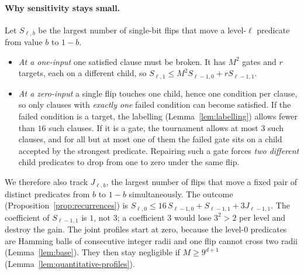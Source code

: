 \documentclass[11pt]{article}
\theoremstyle{definition}
\theoremstyle{remark}
\begin{document}
\paragraph{Why sensitivity stays small.}
Let \(S_{\ell,b}\) be the largest number of single-bit flips that move a
level-\(\ell\) predicate from value \(b\) to \(1-b\).
\begin{itemize}[leftmargin=2em]
\item \emph{At a one-input} one satisfied clause must be broken. It has \(M^2\) gates
and \(r\) targets, each on a different child, so
\(S_{\ell,1}\le M^2S_{\ell-1,0}+rS_{\ell-1,1}\).
\item \emph{At a zero-input} a single flip touches one child, hence one
condition per clause, so only clauses with \emph{exactly one} failed condition
can become satisfied. If the failed condition is a target, the labelling
(Lemma~\ref{lem:labelling}) allows fewer than \(16\) such clauses. If it is a gate,
the tournament allows at most \(3\) such clauses, and for all but at most one
of them the failed gate sits on a child accepted by the strongest predicate.
Repairing such a gate forces \emph{two different} child predicates to drop from one to
zero under the same flip.
\end{itemize}
We therefore also track \(J_{\ell,b}\), the largest number of flips that move
a fixed pair of distinct predicates from \(b\) to \(1-b\) simultaneously.
The outcome (Proposition~\ref{prop:recurrences}) is
\(S_{\ell,0}\le 16\,S_{\ell-1,0}+S_{\ell-1,1}+3J_{\ell-1,1}\).
The coefficient of \(S_{\ell-1,1}\) is \(1\), not \(3\); a coefficient \(3\)
would lose \(3^2>2\) per level and destroy the gain.
The joint profiles start at zero, because the level-\(0\) predicates are Hamming
balls of consecutive integer radii and one flip cannot cross two radii
(Lemma~\ref{lem:base}). They then stay negligible if \(M\ge9^{d+1}\)
(Lemma~\ref{lem:quantitative-profiles}).
\end{document}

